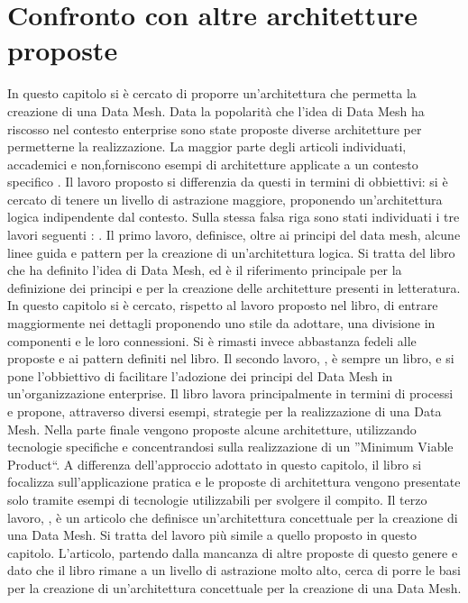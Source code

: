 \documentclass[a4paper,12pt]{report}
\begin{document}
\section{Confronto con altre architetture proposte}
In questo capitolo si è cercato di proporre un'architettura che permetta la creazione di una Data Mesh. 
Data la popolarità che l'idea di Data Mesh ha riscosso nel contesto enterprise sono state proposte diverse architetture per permetterne la realizzazione.
La maggior parte degli articoli individuati, accademici e non,forniscono esempi di architetture applicate a un contesto specifico \cite{falconi2023adopting,pakrashi2023cowmesh,joshi_data_2021,blog_data_2022}.
Il lavoro proposto si differenzia da questi in termini di obbiettivi: si è cercato di tenere un livello di astrazione maggiore, proponendo un'architettura logica indipendente dal contesto. 
Sulla stessa falsa riga sono stati individuati i tre lavori seguenti : \cite{dehghani_data_2022, majchrzak2023data,machado2021data}.
Il primo lavoro, \cite{dehghani_data_2022} definisce, oltre ai principi del data mesh, alcune linee guida e pattern per la creazione di un'architettura logica.
Si tratta del libro che ha definito l'idea di Data Mesh, ed è il riferimento principale per la definizione dei principi e per la creazione delle architetture presenti in letteratura.
In questo capitolo si è cercato, rispetto al lavoro proposto nel libro, di entrare maggiormente nei dettagli proponendo uno stile da adottare, una divisione in componenti e le loro connessioni.
Si è rimasti invece abbastanza fedeli alle proposte e ai pattern definiti nel libro.
Il secondo lavoro, \cite{majchrzak2023data}, è sempre un libro, e si pone l'obbiettivo di facilitare l'adozione dei principi del Data Mesh in un'organizzazione enterprise.
Il libro lavora principalmente in termini di processi e propone, attraverso diversi esempi, strategie per la realizzazione di una Data Mesh.
Nella parte finale vengono proposte alcune architetture, utilizzando tecnologie specifiche e concentrandosi sulla realizzazione di un ''Minimum Viable Product``.
A differenza dell'approccio adottato in questo capitolo, il libro si focalizza sull'applicazione pratica e le proposte di architettura vengono presentate solo tramite esempi di tecnologie utilizzabili per svolgere il compito.
Il terzo lavoro, \cite{machado2021data}, è un articolo che definisce un'architettura concettuale per la creazione di una Data Mesh.
Si tratta del lavoro più simile a quello proposto in questo capitolo.
L'articolo, partendo dalla mancanza di altre proposte di questo genere e dato che il libro \cite{dehghani_data_2022} rimane a un livello di astrazione molto alto, cerca di porre le basi per la creazione di un'architettura concettuale per la creazione di una Data Mesh.
\end{document}
